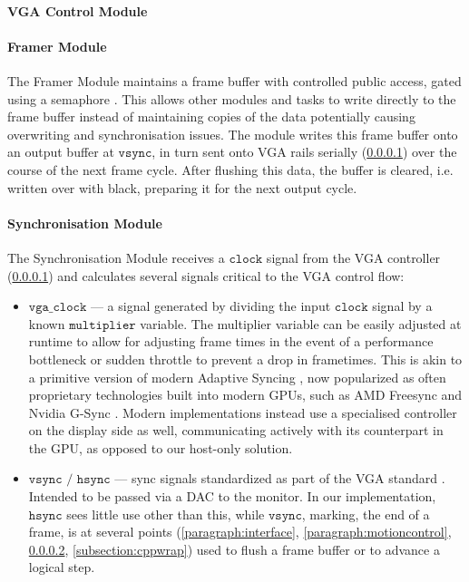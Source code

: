 \paragraph{VGA Control Module}
\label{paragraph:vgacontrol}
%
\paragraph{Framer Module}
\label{paragraph:framer}
%
The Framer Module maintains a frame buffer with controlled public access,
gated using a semaphore \cite{semaphore}. This allows other modules and tasks 
to write directly to the frame buffer instead of maintaining copies of the data 
potentially causing overwriting and synchronisation issues. The module writes this
frame buffer onto an output buffer at \(\texttt{vsync}\), 
in turn sent onto VGA rails serially (\ref{paragraph:vgacontrol})
over the course of the next frame cycle. After flushing this data, the buffer is cleared,
i.e. written over with black, preparing it for the next output cycle.

\paragraph{Synchronisation Module}
\label{paragraph:vgasync}
%
The Synchronisation Module receives a \(\texttt{clock}\) signal from
the VGA controller (\ref{paragraph:vgacontrol}) and calculates several
signals critical to the VGA control flow:

\begin{itemize}
    \item \(\texttt{vga\_clock}\) --- a signal generated by dividing the 
            input \(\texttt{clock}\) signal by a known \(\texttt{multiplier}\)
            variable. The multiplier variable can be easily adjusted at runtime
            to allow for adjusting frame times in the event of a performance
            bottleneck or sudden throttle to prevent a drop in frametimes. This
            is akin to a primitive version of modern Adaptive Syncing \cite{varrefresh},
            now popularized as often proprietary technologies built into modern GPUs,
            such as AMD Freesync \cite{freesync} and Nvidia G-Sync \cite{gsync}. 
            Modern implementations instead use a specialised controller on the display
            side as well, communicating actively with its counterpart in the GPU,
            as opposed to our host-only solution.
    \item \(\texttt{vsync / hsync}\) --- sync signals standardized as part of the VGA
            standard \cite{vgastandard}. Intended to be passed via a DAC to the monitor.
            In our implementation, \(\texttt{hsync}\) sees little use other than this,
            while \(\texttt{vsync}\), marking, the end of a frame, is at several points 
            (\ref{paragraph:interface}, \ref{paragraph:motioncontrol}, \ref{paragraph:framer}, 
            \ref{subsection:cppwrap}) used to flush a frame buffer or to advance a logical step.
\end{itemize}


